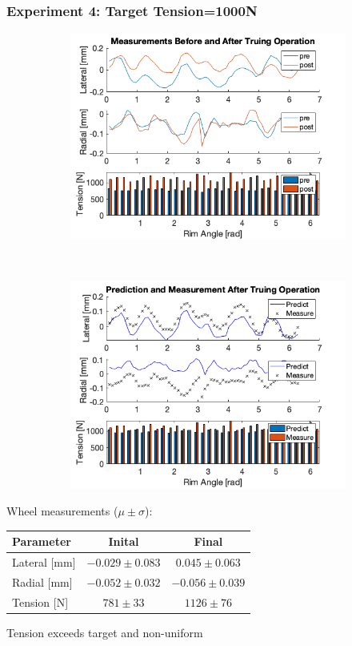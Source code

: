 \documentclass[mathserif]{beamer}
\begin{document}
\begin{frame}
\frametitle{Experiment 4: Target Tension=1000N}
\begin{figure}
        \centering
        \begin{subfigure}[b]{0.45\textwidth}
            \includegraphics[width=\textwidth]{exp4_pre_post}
        \end{subfigure}
        ~
        \begin{subfigure}[b]{0.45\textwidth}
            \includegraphics[width=\textwidth]{exp4_predict_measure}
        \end{subfigure}
\end{figure}
Wheel measurements ($\mu \pm \sigma$):
\centering
\begin{tabular}{| l | c | c |}
    \hline
    Parameter & Inital & Final \\ \hline
    Lateral [mm] & $-0.029\pm0.083$ &$0.045\pm 0.063$ \\ \hline 
    Radial [mm] &$-0.052\pm0.032$& $-0.056\pm0.039$ \\ \hline 
    Tension [N] &$781\pm33$& $1126\pm76$ \\ \hline 
\end{tabular}
\begin{block}{}
    Tension exceeds target and non-uniform
\end{block}
\end{frame}
\end{document}

